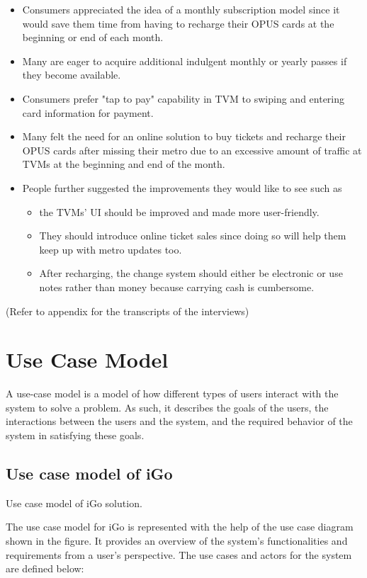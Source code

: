 \documentclass[a4paper,12pt]{article}
\begin{document}
\begin{itemize}
    \item Consumers appreciated the idea of a monthly subscription model since it would save them time from having to recharge their OPUS cards at the beginning or end of each month.
    \item Many are eager to acquire additional indulgent monthly or yearly passes if they become available.
    \item Consumers prefer "tap to pay" capability in TVM to swiping and entering card information for payment.
    \item Many felt the need for an online solution to buy tickets and recharge their OPUS cards after missing their metro due to an excessive amount of traffic at TVMs at the beginning and end of the month.
    \item People further suggested the improvements they would like to see such as
    \begin{itemize}
        \item the TVMs' UI should be improved and made more user-friendly.
        \item They should introduce online ticket sales since doing so will help them keep up with metro updates too.
        \item After recharging, the change system should either be electronic or use notes rather than money because carrying cash is cumbersome.
    \end{itemize}
\end{itemize}

(Refer to appendix for the transcripts of the interviews)

\newpage
\section{Use Case Model}
A use-case model is a model of how different types of users interact with the system to solve a problem.  As such, it describes the goals of the users, the interactions between the users and the system, and the required behavior of the system in satisfying these goals.
\subsection{Use case model of iGo}
\begin{center}
\caption{Use case model of iGo solution.}
\end{center} \par
The use case model for iGo is represented with the help of the use case diagram shown in the figure. It provides an overview of the system's functionalities and requirements from a user's perspective. The use cases and actors for the system are defined below:
 
\end{document}
